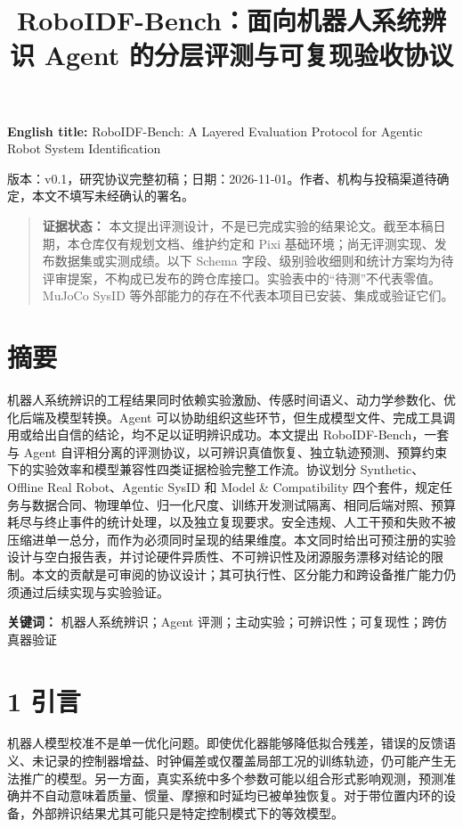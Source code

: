 \documentclass[
  chinese,
  11pt,
  a4paper,
  fontset=fandol]{ctexart}
\title{RoboIDF-Bench：面向机器人系统辨识 Agent
的分层评测与可复现验收协议}
\author{}
\date{}
\begin{document}
\maketitle

\textbf{English title:} RoboIDF-Bench: A Layered Evaluation Protocol for
Agentic Robot System Identification

版本：v0.1，研究协议完整初稿；日期：2026-11-01。作者、机构与投稿渠道待确定，本文不填写未经确认的署名。

\begin{quote}
\textbf{证据状态：}
本文提出评测设计，不是已完成实验的结果论文。截至本稿日期，本仓库仅有规划文档、维护约定和
Pixi 基础环境；尚无评测实现、发布数据集或实测成绩。以下 Schema
字段、级别验收细则和统计方案均为待评审提案，不构成已发布的跨仓库接口。实验表中的``待测''不代表零值。MuJoCo
SysID 等外部能力的存在不代表本项目已安装、集成或验证它们。
\end{quote}

\section{摘要}\label{ux6458ux8981}

机器人系统辨识的工程结果同时依赖实验激励、传感时间语义、动力学参数化、优化后端及模型转换。Agent
可以协助组织这些环节，但生成模型文件、完成工具调用或给出自信的结论，均不足以证明辨识成功。本文提出
RoboIDF-Bench，一套与 Agent
自评相分离的评测协议，以可辨识真值恢复、独立轨迹预测、预算约束下的实验效率和模型兼容性四类证据检验完整工作流。协议划分
Synthetic、Offline Real Robot、Agentic SysID 和 Model \& Compatibility
四个套件，规定任务与数据合同、物理单位、归一化尺度、训练开发测试隔离、相同后端对照、预算耗尽与终止事件的统计处理，以及独立复现要求。安全违规、人工干预和失败不被压缩进单一总分，而作为必须同时呈现的结果维度。本文同时给出可预注册的实验设计与空白报告表，并讨论硬件异质性、不可辨识性及闭源服务漂移对结论的限制。本文的贡献是可审阅的协议设计；其可执行性、区分能力和跨设备推广能力仍须通过后续实现与实验验证。

\textbf{关键词：} 机器人系统辨识；Agent
评测；主动实验；可辨识性；可复现性；跨仿真器验证

\section{1 引言}\label{ux5f15ux8a00}

机器人模型校准不是单一优化问题。即使优化器能够降低拟合残差，错误的反馈语义、未记录的控制器增益、时钟偏差或仅覆盖局部工况的训练轨迹，仍可能产生无法推广的模型。另一方面，真实系统中多个参数可能以组合形式影响观测，预测准确并不自动意味着质量、惯量、摩擦和时延均已被单独恢复。对于带位置内环的设备，外部辨识结果尤其可能只是特定控制模式下的等效模型。
\end{document}
